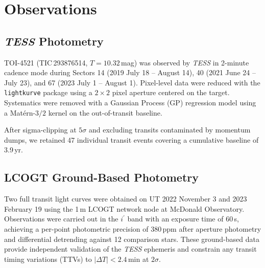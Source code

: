 \section{Observations}
\label{sec:obs}

\subsection{\textit{TESS} Photometry}
\label{sec:tess}

TOI-4521 (TIC\,293876514, $T = 10.32$\,mag) was observed by \textit{TESS}
in 2-minute cadence mode during Sectors 14 (2019 July 18 -- August 14),
40 (2021 June 24 -- July 23), and 67 (2023 July 1 -- August 1).
Pixel-level data were reduced with the \texttt{lightkurve} package
\citep{Lightkurve2018} using a $2\times2$ pixel aperture centered on the
target.  Systematics were removed with a Gaussian Process (GP) regression
model using a Mat\'ern-$3/2$ kernel on the out-of-transit baseline.

After sigma-clipping at $5\sigma$ and excluding transits contaminated by
momentum dumps, we retained 47 individual transit events covering a
cumulative baseline of 3.9\,yr.

\subsection{LCOGT Ground-Based Photometry}
\label{sec:lcogt}

Two full transit light curves were obtained on UT 2022 November 3 and
2023 February 19 using the 1\,m LCOGT network node at McDonald
Observatory.  Observations were carried out in the $i^\prime$ band
with an exposure time of 60\,s, achieving a per-point photometric
precision of 380\,ppm after aperture photometry and differential
detrending against 12 comparison stars.  These ground-based data
provide independent validation of the \textit{TESS} ephemeris and
constrain any transit timing variations (TTVs) to
$|\Delta T| < 2.4\,\mathrm{min}$ at $2\sigma$.

